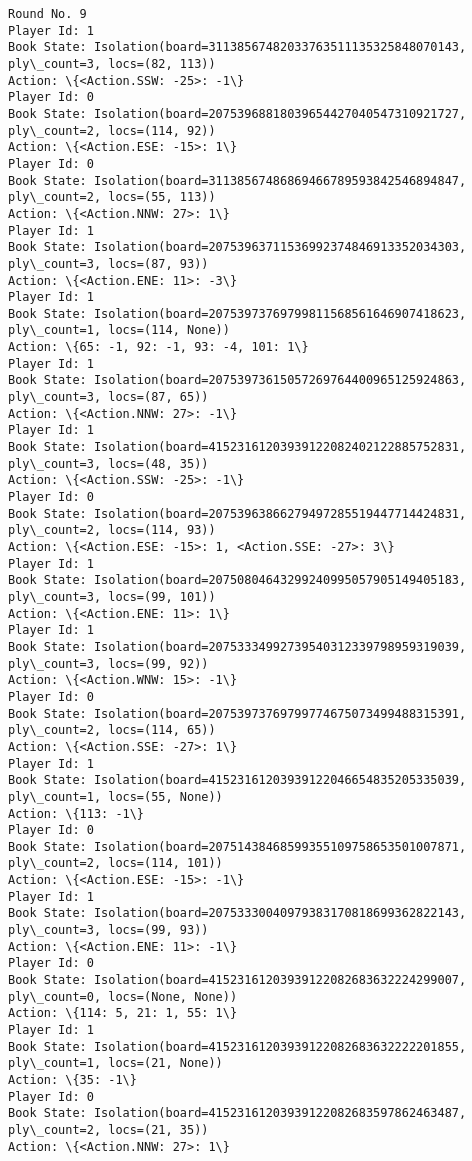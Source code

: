 \documentclass[11pt]{article}
\begin{document}
\begin{Verbatim}[commandchars=\\\{\}]
Round No. 9
Player Id: 1
Book State: Isolation(board=31138567482033763511135325848070143, ply\_count=3, locs=(82, 113))
Action: \{<Action.SSW: -25>: -1\}
Player Id: 0
Book State: Isolation(board=20753968818039654427040547310921727, ply\_count=2, locs=(114, 92))
Action: \{<Action.ESE: -15>: 1\}
Player Id: 0
Book State: Isolation(board=31138567486869466789593842546894847, ply\_count=2, locs=(55, 113))
Action: \{<Action.NNW: 27>: 1\}
Player Id: 1
Book State: Isolation(board=20753963711536992374846913352034303, ply\_count=3, locs=(87, 93))
Action: \{<Action.ENE: 11>: -3\}
Player Id: 1
Book State: Isolation(board=20753973769799811568561646907418623, ply\_count=1, locs=(114, None))
Action: \{65: -1, 92: -1, 93: -4, 101: 1\}
Player Id: 1
Book State: Isolation(board=20753973615057269764400965125924863, ply\_count=3, locs=(87, 65))
Action: \{<Action.NNW: 27>: -1\}
Player Id: 1
Book State: Isolation(board=41523161203939122082402122885752831, ply\_count=3, locs=(48, 35))
Action: \{<Action.SSW: -25>: -1\}
Player Id: 0
Book State: Isolation(board=20753963866279497285519447714424831, ply\_count=2, locs=(114, 93))
Action: \{<Action.ESE: -15>: 1, <Action.SSE: -27>: 3\}
Player Id: 1
Book State: Isolation(board=20750804643299240995057905149405183, ply\_count=3, locs=(99, 101))
Action: \{<Action.ENE: 11>: 1\}
Player Id: 1
Book State: Isolation(board=20753334992739540312339798959319039, ply\_count=3, locs=(99, 92))
Action: \{<Action.WNW: 15>: -1\}
Player Id: 0
Book State: Isolation(board=20753973769799774675073499488315391, ply\_count=2, locs=(114, 65))
Action: \{<Action.SSE: -27>: 1\}
Player Id: 1
Book State: Isolation(board=41523161203939122046654835205335039, ply\_count=1, locs=(55, None))
Action: \{113: -1\}
Player Id: 0
Book State: Isolation(board=20751438468599355109758653501007871, ply\_count=2, locs=(114, 101))
Action: \{<Action.ESE: -15>: -1\}
Player Id: 1
Book State: Isolation(board=20753330040979383170818699362822143, ply\_count=3, locs=(99, 93))
Action: \{<Action.ENE: 11>: -1\}
Player Id: 0
Book State: Isolation(board=41523161203939122082683632224299007, ply\_count=0, locs=(None, None))
Action: \{114: 5, 21: 1, 55: 1\}
Player Id: 1
Book State: Isolation(board=41523161203939122082683632222201855, ply\_count=1, locs=(21, None))
Action: \{35: -1\}
Player Id: 0
Book State: Isolation(board=41523161203939122082683597862463487, ply\_count=2, locs=(21, 35))
Action: \{<Action.NNW: 27>: 1\}


\end{Verbatim}
\end{document}
